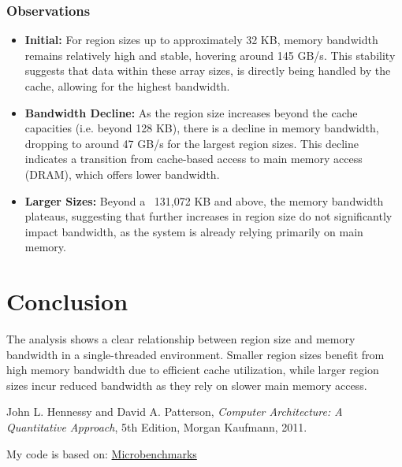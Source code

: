 \documentclass[12pt]{article}
\begin{document}
	\subsubsection{Observations}
	\begin{itemize}
		\item \textbf{Initial:} For region sizes up to approximately 32 KB, memory bandwidth remains relatively high and stable, hovering around 145 GB/s. This stability suggests that data within these array sizes, is directly being handled by the cache, allowing for the highest bandwidth.
		
		\item \textbf{Bandwidth Decline:} As the region size increases beyond the cache capacities (i.e. beyond 128 KB), there is a decline in memory bandwidth, dropping to around 47 GB/s for the largest region sizes. This decline indicates a transition from cache-based access to main memory access (DRAM), which offers lower bandwidth.
		
		\item \textbf{Larger Sizes:} Beyond a ~131,072 KB and above, the memory bandwidth plateaus, suggesting that further increases in region size do not significantly impact bandwidth, as the system is already relying primarily on main memory.
	\end{itemize}
	
	\section{Conclusion}
	The analysis shows a clear relationship between region size and memory bandwidth in a single-threaded environment. Smaller region sizes benefit from high memory bandwidth due to efficient cache utilization, while larger region sizes incur reduced bandwidth as they rely on slower main memory access.
	
	\begin{thebibliography}{9}
		John L. Hennessy and David A. Patterson, \textit{Computer Architecture: A Quantitative Approach}, 5th Edition, Morgan Kaufmann, 2011.
		
		My code is based on: \href{https://github.com/ChipsandCheese/Microbenchmarks}{Microbenchmarks}
		
	\end{thebibliography}
	
\end{document}
